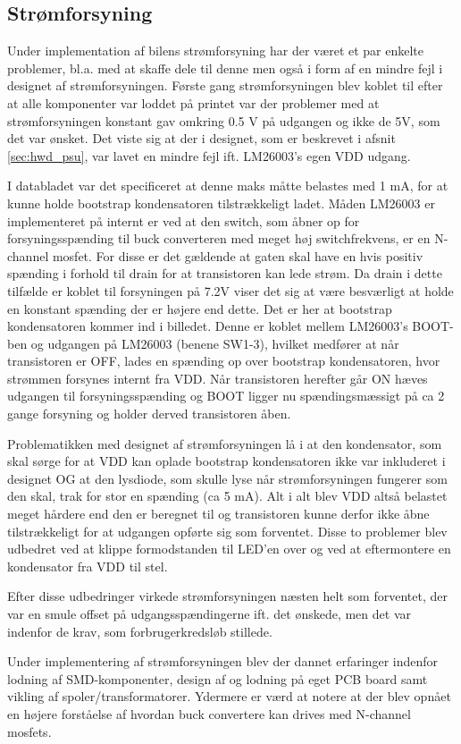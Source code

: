 \subsection{Strømforsyning}

Under implementation af bilens strømforsyning har der været et par enkelte problemer, bl.a. med at skaffe dele til denne men også i form af en mindre fejl i designet af strømforsyningen.
Første gang strømforsyningen blev koblet til efter at alle komponenter var loddet på printet var der problemer med at strømforsyningen konstant gav omkring 0.5 V på udgangen og ikke de 5V, som det var ønsket.
Det viste sig at der i designet, som er beskrevet i afsnit \ref{sec:hwd_psu}, var lavet en mindre fejl ift. LM26003's egen VDD udgang.

I databladet var det specificeret at denne maks måtte belastes med 1 mA, for at kunne holde bootstrap kondensatoren tilstrækkeligt ladet.
Måden LM26003 er implementeret på internt er ved at den switch, som åbner op for forsyningsspænding til buck converteren med meget høj switchfrekvens, er en N-channel mosfet.
For disse er det gældende at gaten skal have en hvis positiv spænding i forhold til drain for at transistoren kan lede strøm. 
Da drain i dette tilfælde er koblet til forsyningen på 7.2V viser det sig at være besværligt at holde en konstant spænding der er højere end dette.
Det er her at bootstrap kondensatoren kommer ind i billedet.
Denne er koblet mellem LM26003's BOOT-ben og udgangen på LM26003 (benene SW1-3), hvilket medfører at når transistoren er OFF, lades en spænding op over bootstrap kondensatoren, hvor strømmen forsynes internt fra VDD.
Når transistoren herefter går ON hæves udgangen til forsyningsspænding og BOOT ligger nu spændingsmæssigt på ca 2 gange forsyning og holder derved transistoren åben.

Problematikken med designet af strømforsyningen lå i at den kondensator, som skal sørge for at VDD kan oplade bootstrap kondensatoren ikke var inkluderet i designet OG at den lysdiode, som skulle lyse når strømforsyningen fungerer som den skal, trak for stor en spænding (ca 5 mA).
Alt i alt blev VDD altså belastet meget hårdere end den er beregnet til og transistoren kunne derfor ikke åbne tilstrækkeligt for at udgangen opførte sig som forventet.
Disse to problemer blev udbedret ved at klippe formodstanden til LED'en over og ved at eftermontere en kondensator fra VDD til stel.

Efter disse udbedringer virkede strømforsyningen næsten helt som forventet, der var en smule offset på udgangsspændingerne ift. det ønskede, men det var indenfor de krav, som forbrugerkredsløb stillede.

Under implementering af strømforsyningen blev der dannet erfaringer indenfor lodning af SMD-komponenter, design af og lodning på eget PCB board samt vikling af spoler/transformatorer. 
Ydermere er værd at notere at der blev opnået en højere forståelse af hvordan buck convertere kan drives med N-channel mosfets.
